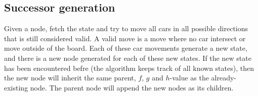 \subsection*{Successor generation}
Given a node, fetch the state and try to move all cars in all possible
directions that is still considered valid. A valid move is a move where no car
intersect or move outside of the board. Each of these car movements generate a new state,
and there is a new node generated for each of these new states. If the new state has been
encountered befre (the algorithm keeps track of all known states), then the new node
will inherit the same parent, $f$, $g$ and $h$-value as the already-existing node.
The parent node will append the new nodes as its children.



